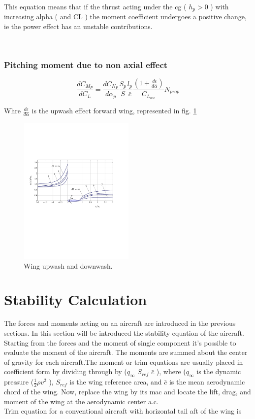 This equation means that if the thrust acting under the cg ( $h_p > 0$ ) with increasing alpha ( and CL ) the moment coefficient undergoes a positive change, ie the power effect has an unstable contributions.

\noindent \\
\subsubsection {Pitching moment due to non axial effect}
\begin{equation}
\frac{dC_{M_P}}{dC_L} = \frac{dC_{N_P}}{d\alpha_p} \frac{S_p}{S} \frac{l_p}{\bar c} \frac{ \left ( 1 + \frac{d \epsilon}{d \alpha} \right )}{C_{L_{\alpha w}}} N_{prop}
\end{equation}

Whre $\frac{d \epsilon}{d \alpha}$ is the upwash effect forward wing, represented in fig. \ref {wingud}

\begin{figure}[H]
\centering
\includegraphics[height=7.3cm]{Immagini/wing_up-downwash}
\caption{Wing upwash and downwash.}
\label{wingud}
\end{figure}



\section{Stability Calculation}

The forces and moments acting on an aircraft are introduced in the previous sections. In this section will be introduced the stability equation of the aircraft. Starting from the forces and the moment of single component it's possible to evaluate the moment of the aircraft. The moments are summed about the center of gravity for each aircraft.The moment or trim equations are usually placed in coefficient form by dividing through by ($q_{\infty}$ $S_{ref}$ $\bar{c}$ ), where ($q_{\infty}$ is the dynamic pressure ($\frac{1}{2} \rho v^2$ ), $S_{ref}$ is the wing reference area, and $\bar{c}$ is the mean aerodynamic chord of the wing. Now, replace the wing by its mac and locate the lift, drag, and moment of the wing at the aerodynamic center a.c.\\
Trim equation for a conventional aircraft with horizontal tail aft of the wing is

